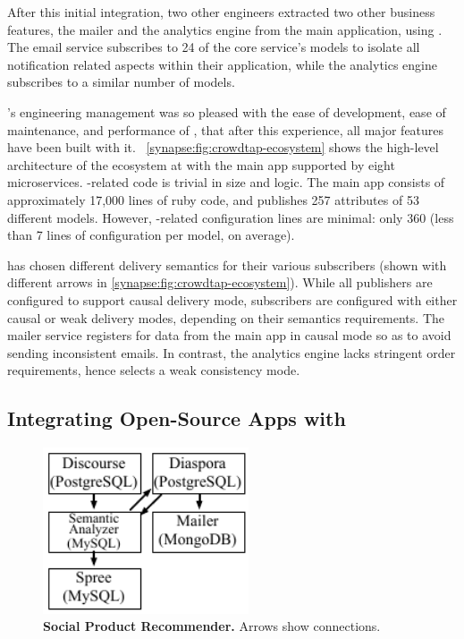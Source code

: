 After this initial integration, two other \crowdtap engineers extracted two other business features, the mailer and the analytics engine from the main application, using \synapse.
The email service subscribes to 24 of the core service's models to isolate all
notification related aspects within their application, while the analytics
engine subscribes to a similar number of models.

\crowdtap's engineering management was so pleased with the ease of development,
ease of maintenance, and performance of \synapse, that after this experience,
all major features have been built with it.
\F~\ref{synapse:fig:crowdtap-ecosystem} shows the high-level architecture of the
\synapse ecosystem at \crowdtap with the main app supported by eight
microservices.
\synapse-related code is trivial in size and logic.
The \crowdtap main app consists of approximately 17,000 lines of ruby code, and publishes 257 attributes of 53 different models.
However, \synapse-related configuration lines are minimal: only 360 (less
than 7 lines of configuration per model, on average).

\crowdtap has chosen different delivery semantics for their various subscribers
(shown with different arrows in \F\ref{synapse:fig:crowdtap-ecosystem}). While all
publishers are configured to support causal delivery mode, subscribers are
configured with either causal or weak delivery modes, depending on their
semantics requirements. The mailer service registers for data from
the main app in causal mode so as to avoid sending inconsistent emails.
In contrast, the analytics engine lacks stringent order
requirements, hence selects a weak consistency mode.

\subsection{Integrating Open-Source Apps with \synapse}
\label{synapse:sec:apps:social}

\begin{figure}[t]
\centering
   \includegraphics[width=2.4in]{figures/synapse/eco-social.pdf}
   \caption{{\bf Social Product Recommender.} Arrows show \synapse connections.}
   \label{synapse:fig:social-ecosystem}
\end{figure}

